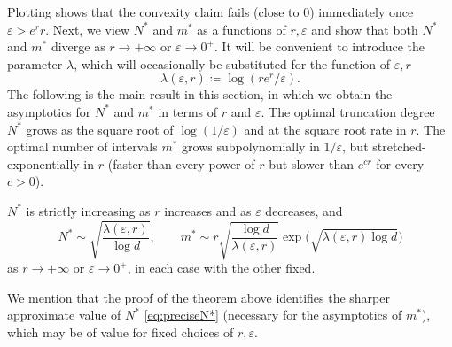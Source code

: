 \documentclass{article}
\def\eps{\varepsilon}
\numberwithin{equation}{section}
\theoremstyle{definition}
\theoremstyle{remark}
\begin{document}
Plotting shows that the convexity claim fails (close to $0$) immediately once $\eps > e^r r$. Next, we view $N^*$ and $m^*$ as a functions of $r,\eps$ and show that both $N^*$ and $m^*$ diverge as $r \to +\infty$ or $\eps \to 0^+$. It will be convenient to introduce the parameter $\lambda$, which will occasionally be substituted for the function of $\eps, r$
\begin{equation}\label{eq:lambda}
\lambda(\eps, r) \coloneqq \log(r e^r/\eps).
\end{equation}
The following is the main result in this section, in which we obtain the asymptotics for $N^*$ and $m^*$ in terms of $r$ and $\eps$. The optimal truncation degree $N^*$ grows as the square root of $\log(1/\eps)$ and at the square root rate in $r$. The optimal number of intervals $m^*$ grows subpolynomially in $1/\eps$, but stretched-exponentially in $r$ (faster than every power of $r$ but slower than $e^{cr}$ for every $c>0$).
\begin{theorem}\label{thm:asympN*m*}
$N^*$ is strictly increasing as $r$ increases and as $\eps$ decreases, and
\[
N^* \sim \sqrt{\frac{\lambda(\eps, r)}{\log d}},\qquad m^* \sim r \sqrt{\frac{\log d}{\lambda(\eps, r)}} \exp \big(\sqrt{\lambda(\eps, r) \log d}\big)
\]
as $r \to +\infty$ or $\eps \to 0^+$, in each case with the other fixed.
\end{theorem}

We mention that the proof of the theorem above identifies the sharper approximate value of $N^*$ \eqref{eq:preciseN*} (necessary for the asymptotics of $m^*$), which may be of value for fixed choices of $r,\eps$.
\end{document}
